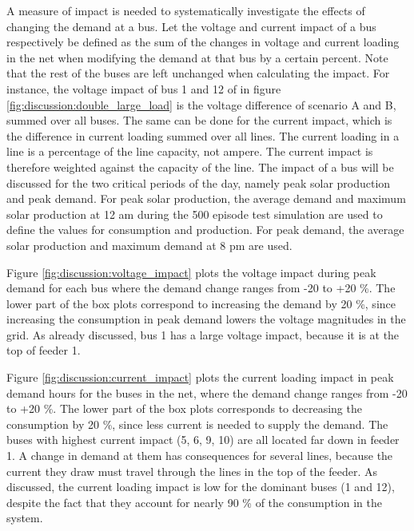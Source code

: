 \documentclass[class=book, crop=false, 11pt]{standalone}
\begin{document}
A measure of impact is needed to systematically investigate the effects of changing the demand at a bus. Let the voltage and current impact of a bus respectively be defined as the sum of the changes in voltage and current loading in the net when modifying the demand at that bus by a certain percent. Note that the rest of the buses are left unchanged when calculating the impact. For instance, the voltage impact of bus 1 and 12 of in figure \ref{fig:discussion:double_large_load} is the voltage difference of scenario A and B, summed over all buses. The same can be done for the current impact, which is the difference in current loading summed over all lines. The current loading in a line is a percentage of the line capacity, not ampere. The current impact is therefore weighted against the capacity of the line. The impact of a bus will be discussed for the two critical periods of the day, namely peak solar production and peak demand. For peak solar production, the average demand and maximum solar production at 12 am during the 500 episode test simulation are used to define the values for consumption and production. For peak demand, the average solar production and maximum demand at 8 pm are used. 


Figure \ref{fig:discussion:voltage_impact} plots the voltage impact during peak demand for each bus where the demand change ranges from -20 to +20 \%. The lower part of the box plots correspond to increasing the demand by 20 \%, since increasing the consumption in peak demand lowers the voltage magnitudes in the grid. As already discussed, bus 1 has a large voltage impact, because it is at the top of feeder 1. 


Figure \ref{fig:discussion:current_impact} plots the current loading impact in peak demand hours for the buses in the net, where the demand change ranges from -20 to +20 \%. The lower part of the box plots corresponds to decreasing the consumption by 20 \%, since less current is needed to supply the demand. The buses with highest current impact (5, 6, 9, 10) are all located far down in feeder 1. A change in demand at them has consequences for several lines, because the current they draw must travel through the lines in the top of the feeder. As discussed, the current loading impact is low for the dominant buses (1 and 12), despite the fact that they account for nearly 90 \% of the consumption in the system. 
\end{document}
